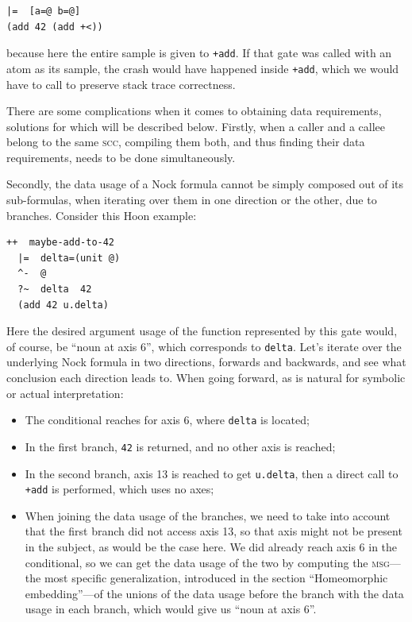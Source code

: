 \documentclass[twoside]{article}
\begin{document}
\begin{lstlisting}[style=listingblock]
|=  [a=@ b=@]
(add 42 (add +<))
\end{lstlisting}

because here the entire sample is given to \lstinline[style=inlinecode]{+add}. If that gate was called with an atom as its sample, the crash would have happened inside \lstinline[style=inlinecode]{+add}, which we would have to call to preserve stack trace correctness.

There are some complications when it comes to obtaining data requirements, solutions for which will be described below. Firstly, when a caller and a callee belong to the same \textsc{scc}, compiling them both, and thus finding their data requirements, needs to be done simultaneously.

Secondly, the data usage of a Nock formula cannot be simply composed out of its sub-formulas, when iterating over them in one direction or the other, due to branches. Consider this Hoon example:

\begin{lstlisting}[style=listingblock]
++  maybe-add-to-42
  |=  delta=(unit @)
  ^-  @
  ?~  delta  42
  (add 42 u.delta)
\end{lstlisting}

Here the desired argument usage of the function represented by this gate would, of course, be ``noun at axis 6'', which corresponds to \texttt{delta}. Let's iterate over the underlying Nock formula in two directions, forwards and backwards, and see what conclusion each direction leads to. When going forward, as is natural for symbolic or actual interpretation:

\begin{itemize}
  \item  The conditional reaches for axis 6, where \texttt{delta} is located;
  \item  In the first branch, \texttt{42} is returned, and no other axis is reached;
  \item  In the second branch, axis 13 is reached to get \texttt{u.delta}, then a direct call to \lstinline[style=inlinecode]{+add} is performed, which uses no axes;
  \item  When joining the data usage of the branches, we need to take into account that the first branch did not access axis 13, so that axis might not be present in the subject, as would be the case here. We did already reach axis 6 in the conditional, so we can get the data usage of the two by computing the \textsc{msg}---the most specific generalization, introduced in the section ``Homeomorphic embedding''---of the unions of the data usage before the branch with the data usage in each branch, which would give us ``noun at axis 6''.
\end{itemize}
\end{document}
